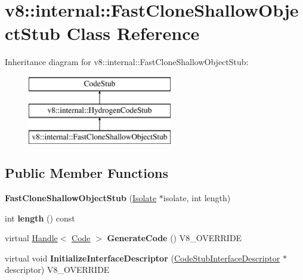 \hypertarget{classv8_1_1internal_1_1_fast_clone_shallow_object_stub}{}\section{v8\+:\+:internal\+:\+:Fast\+Clone\+Shallow\+Object\+Stub Class Reference}
\label{classv8_1_1internal_1_1_fast_clone_shallow_object_stub}
Inheritance diagram for v8\+:\+:internal\+:\+:Fast\+Clone\+Shallow\+Object\+Stub\+:\begin{figure}[H]
\begin{center}
\leavevmode
\includegraphics[height=3.000000cm]{classv8_1_1internal_1_1_fast_clone_shallow_object_stub}
\end{center}
\end{figure}
\subsection*{Public Member Functions}
\begin{DoxyCompactItemize}
\item 
\hypertarget{classv8_1_1internal_1_1_fast_clone_shallow_object_stub_a239d172f31642cae167ee732745d65e4}{}{\bfseries Fast\+Clone\+Shallow\+Object\+Stub} (\hyperlink{classv8_1_1internal_1_1_isolate}{Isolate} $\ast$isolate, int length)\label{classv8_1_1internal_1_1_fast_clone_shallow_object_stub_a239d172f31642cae167ee732745d65e4}

\item 
\hypertarget{classv8_1_1internal_1_1_fast_clone_shallow_object_stub_a346a73565eb143b68cdeab68c5b553d4}{}int {\bfseries length} () const \label{classv8_1_1internal_1_1_fast_clone_shallow_object_stub_a346a73565eb143b68cdeab68c5b553d4}

\item 
\hypertarget{classv8_1_1internal_1_1_fast_clone_shallow_object_stub_ae436be15178d56f6a78800476c0ec05f}{}virtual \hyperlink{classv8_1_1internal_1_1_handle}{Handle}$<$ \hyperlink{classv8_1_1internal_1_1_code}{Code} $>$ {\bfseries Generate\+Code} () V8\+\_\+\+O\+V\+E\+R\+R\+I\+D\+E\label{classv8_1_1internal_1_1_fast_clone_shallow_object_stub_ae436be15178d56f6a78800476c0ec05f}

\item 
\hypertarget{classv8_1_1internal_1_1_fast_clone_shallow_object_stub_a31d3102f9eee79446f7ea2d220bbe7f5}{}virtual void {\bfseries Initialize\+Interface\+Descriptor} (\hyperlink{classv8_1_1internal_1_1_code_stub_interface_descriptor}{Code\+Stub\+Interface\+Descriptor} $\ast$descriptor) V8\+\_\+\+O\+V\+E\+R\+R\+I\+D\+E\label{classv8_1_1internal_1_1_fast_clone_shallow_object_stub_a31d3102f9eee79446f7ea2d220bbe7f5}

\end{DoxyCompactItemize}
